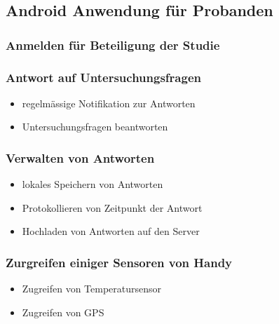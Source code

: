 \documentclass[a4paper]{scrreprt}
\begin{document}
            \subsection{Android Anwendung f\"ur Probanden}
                \vspace*{0.2cm}

                \subsubsection{Anmelden f\"ur Beteiligung der Studie}

                \subsubsection{Antwort auf Untersuchungsfragen}
                    \begin{itemize}
                        \item regelm\"assige Notifikation zur Antworten
                        \item Untersuchungsfragen beantworten
                    \end{itemize}

                \subsubsection{Verwalten von Antworten}
                    \begin{itemize}
                        \item lokales Speichern von Antworten
                        \item Protokollieren von Zeitpunkt der Antwort
                        \item Hochladen von Antworten auf den Server
                    \end{itemize}

                \subsubsection{Zurgreifen einiger Sensoren von Handy}
                    \begin{itemize}
                        \item Zugreifen von Temperatursensor
                        \item Zugreifen von GPS
                    \end{itemize}
                \vspace*{0.5cm}
\end{document}
